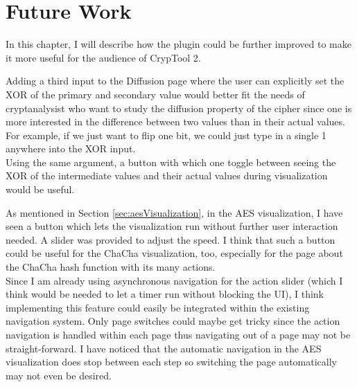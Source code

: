 \chapter{Future Work}
\label{chap:futureWork}

In this chapter, I will describe how the plugin could be further improved to make it more useful for the audience of CrypTool 2.

\begin{description}[style=nextline]
\item[Diffusion: XOR input and button to toggle between XOR and actual values] 

Adding a third input to the Diffusion page where the user can explicitly set the XOR of the primary and secondary value would better fit the needs of cryptanalysist who want to study the diffusion property of the cipher since one is more interested in the difference between two values than in their actual values. For example, if we just want to flip one bit, we could just type in a single 1 anywhere into the XOR input. \\
Using the same argument, a button with which one toggle between seeing the XOR of the intermediate values and their actual values during visualization would be useful.

\item[Automatic navigation]

As mentioned in Section \ref{sec:aesVisualization}, in the AES visualization, I have seen a button which lets the visualization run without further user interaction needed. A slider was provided to adjust the speed. I think that such a button could be useful for the ChaCha visualization, too, especially for the page about the ChaCha hash function with its many actions. \\
Since I am already using asynchronous navigation for the action slider (which I think would be needed to let a timer run without blocking the UI), I think implementing this feature could easily be integrated within the existing navigation system. Only page switches could maybe get tricky since the action navigation is handled within each page thus navigating out of a page may not be straight-forward. I have noticed that the automatic navigation in the AES visualization does stop between each step so switching the page automatically may not even be desired.

\pagebreak

\item[Salsa20 visualization]


\end{description}
